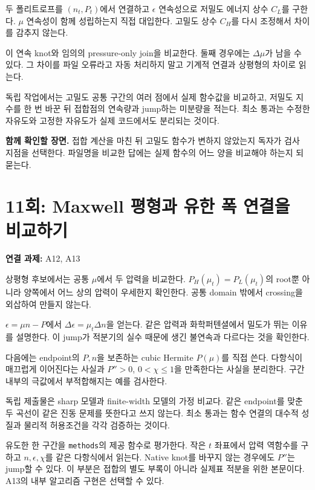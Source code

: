\documentclass[
  10pt,
  a4paper,
]{article}
\begin{document}
두 폴리트로프를 \((n_t,P_t)\)에서 연결하고 \(\epsilon\) 연속성으로
저밀도 에너지 상수 \(C_L\)를 구한다. \(\mu\) 연속성이 함께 성립하는지
직접 대입한다. 고밀도 상수 \(C_H\)를 다시 조정해서 차이를 감추지 않는다.

이 연속 knot와 임의의 pressure-only join을 비교한다. 둘째 경우에는
\(\Delta\mu\)가 남을 수 있다. 그 차이를 파일 오류라고 자동 처리하지 말고
기계적 연결과 상평형의 차이로 읽는다.

독립 작업에서는 고밀도 공통 구간의 여러 점에서 실제 함수값을 비교하고,
저밀도 지수를 한 번 바꾼 뒤 접합점의 연속량과 jump하는 미분량을 적는다.
최소 통과는 수정한 자유도와 고정한 자유도가 실제 코드에서도 분리되는
것이다.

\textbf{함께 확인할 장면.} 접합 계산을 마친 뒤 고밀도 함수가 변하지
않았는지 독자가 검사 지점을 선택한다. 파일명을 비교한 답에는 실제 함수의
어느 양을 비교해야 하는지 되묻는다.

\section{11회: Maxwell 평형과 유한 폭 연결을
비교하기}\label{uxd68c-maxwell-uxd3c9uxd615uxacfc-uxc720uxd55c-uxd3ed-uxc5f0uxacb0uxc744-uxbe44uxad50uxd558uxae30}

\textbf{연결 과제:} A12, A13

상평형 후보에서는 공통 \(\mu\)에서 두 압력을 비교한다.
\(P_H(\mu_t)=P_L(\mu_t)\)의 root뿐 아니라 양쪽에서 어느 상의 압력이
우세한지 확인한다. 공통 domain 밖에서 crossing을 외삽하여 만들지 않는다.

\(\epsilon=\mu n-P\)에서 \(\Delta\epsilon=\mu_t\Delta n\)을 얻는다. 같은
압력과 화학퍼텐셜에서 밀도가 뛰는 이유를 설명한다. 이 jump가 적분기의
실수 때문에 생긴 불연속과 다르다는 것을 확인한다.

다음에는 endpoint의 \(P,n\)을 보존하는 cubic Hermite \(P(\mu)\)를 직접
쓴다. 다항식이 매끄럽게 이어진다는 사실과 \(P''>0\), \(0<\chi\leq1\)을
만족한다는 사실을 분리한다. 구간 내부의 극값에서 부적합해지는 예를
검사한다.

독립 제출물은 sharp 모델과 finite-width 모델의 가정 비교다. 같은
endpoint를 맞춘 두 곡선이 같은 진동 문제를 뜻한다고 쓰지 않는다. 최소
통과는 함수 연결의 대수적 성질과 물리적 허용조건을 각각 검증하는 것이다.

유도한 한 구간을 \texttt{methods}의 제공 함수로 평가한다. 작은 \(t\)
좌표에서 압력 역함수를 구하고 \(n,\epsilon,\chi\)를 같은 다항식에서
읽는다. Native knot를 바꾸지 않는 경우에도 \(P''\)는 jump할 수 있다. 이
부분은 접합의 별도 부록이 아니라 실제표 적분을 위한 본문이다. A13의 내부
알고리즘 구현은 선택할 수 있다.
\end{document}
